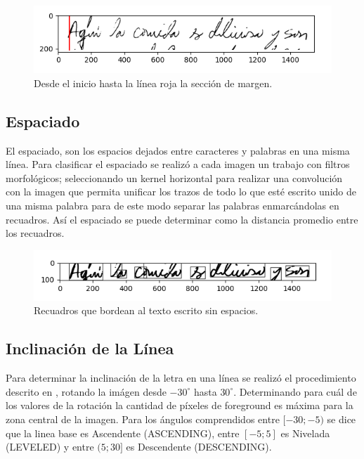 \documentclass[10pt, a4paper]{article}
\begin{document}
            \begin{figure}[!h]
                \centering
                \includegraphics[width = 0.5\linewidth]{Margin.png}
                \caption{Desde el inicio hasta la l\'inea roja la secci\'on de margen.}
            \end{figure}
        \subsection{Espaciado} 

            El espaciado, son los espacios dejados entre caracteres y palabras en una misma l\'inea. Para clasificar el espaciado se realiz\'o a cada imagen un trabajo con filtros morfol\'ogicos; seleccionando un kernel horizontal para realizar una convoluci\'on con la imagen 
            que permita unificar los trazos de todo lo que est\'e escrito unido de una misma palabra para de este modo separar las palabras enmarc\'andolas en recuadros. As\'i el espaciado se puede determinar como la distancia promedio entre los recuadros.

            \begin{figure}[!h]
                \centering
                \includegraphics[width = 0.5\linewidth]{Espaces.png}
                \caption{Recuadros que bordean al texto escrito sin espacios.}
            \end{figure}

        \subsection{Inclinaci\'on de la L\'inea}
            Para determinar la inclinaci\'on de la letra en una l\'inea se realiz\'o el procedimiento descrito en \cite{20}, rotando la im\'agen desde $-30^{\circ}$ hasta $30^{\circ}$. 
            Determinando para cu\'al de los valores de la rotaci\'on la cantidad de p\'ixeles de foreground es m\'axima para la zona central de la imagen. Para los \'angulos comprendidos 
            entre $ [-30; -5) $ se dice que la linea base es Ascendente (ASCENDING), entre $[-5; 5]$ es Nivelada (LEVELED) y entre $(5; 30]$ es Descendente (DESCENDING). 
\end{document}
